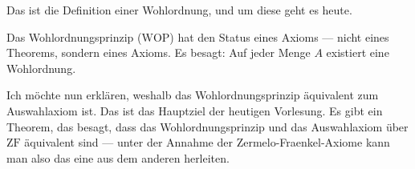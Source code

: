 \begin{math-stroke}
\end{math-stroke}

\begin{spoken-clean}[00:33:16 - 00:34:28]
Das ist die Definition einer Wohlordnung, und um diese geht es heute.

Das Wohlordnungsprinzip ($\text{WOP}$) hat den Status eines Axioms --- nicht eines Theorems, sondern eines Axioms. Es besagt: Auf jeder Menge $A$ existiert eine Wohlordnung.

Ich möchte nun erklären, weshalb das Wohlordnungsprinzip äquivalent zum Auswahlaxiom ist. Das ist das Hauptziel der heutigen Vorlesung. Es gibt ein Theorem, das besagt, dass das Wohlordnungsprinzip und das Auswahlaxiom über $\text{ZF}$ äquivalent sind --- unter der Annahme der Zermelo-Fraenkel-Axiome kann man also das eine aus dem anderen herleiten.
\end{spoken-clean}

\begin{math-stroke}
\end{math-stroke}

\begin{math-stroke}
\end{math-stroke}

